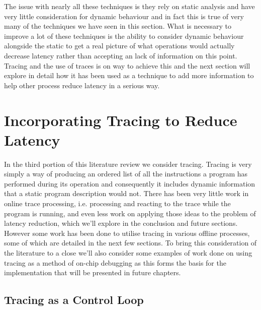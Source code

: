 The issue with nearly all these techniques is they rely on static analysis and have very little consideration for dynamic behaviour and in fact this is true of very many of the techniques we have seen in this section. What is necessary to improve a lot of these techniques is the ability to consider dynamic behaviour alongside the static to get a real picture of what operations would actually decrease latency rather than accepting an lack of information on this point. Tracing and the use of traces is on way to achieve this and the next section will explore in detail how it has been used as a technique to add more information to help other process reduce latency in a serious way. 

\section{Incorporating Tracing to Reduce Latency}

\label{sec:tracing}

In the third portion of this literature review we consider tracing. Tracing is very simply a way of producing an ordered list of all the instructions a program has performed during its operation and consequently it includes dynamic information that a static program description would not. There has been very little work in online trace processing, i.e. processing and reacting to the trace while the program is running, and even less work on applying those ideas to the problem of latency reduction, which we'll explore in the conclusion and future sections. However some work has been done to utilise tracing in various offline processes, some of which are detailed in the next few sections. To bring this consideration of the literature to a close we'll also consider some examples of work done on using tracing as a method of on-chip debugging as this forms the basis for the implementation that will be presented in future chapters.

\subsection{Tracing as a Control Loop}

